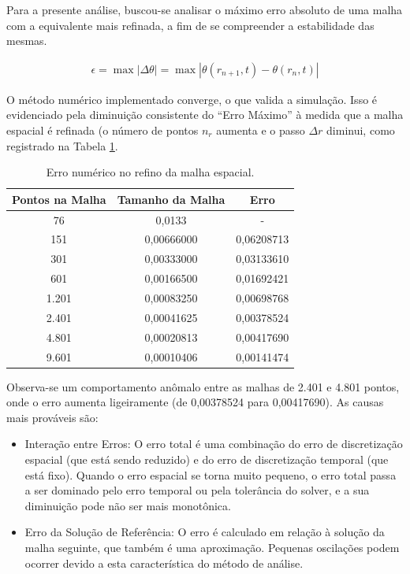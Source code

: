 Para a presente análise, buscou-se analisar o máximo erro absoluto de uma malha com a equivalente mais refinada, a fim de se compreender a estabilidade das mesmas.

\begin{gather}
    \epsilon = \max | \Delta \theta | = \max | \theta(r_{n+1},t) - \theta(r_{n},t) |
\end{gather}

O método numérico implementado converge, o que valida a simulação. Isso é evidenciado pela diminuição consistente do ``Erro Máximo'' à medida que a malha espacial é refinada (o número de pontos $n_r$ aumenta e o passo $\Delta r$ diminui, como registrado na Tabela \ref{tab:error_in_the_spatial_mesh}.

\begin{table}[H]
    \centering
    \caption{Erro numérico no refino da malha espacial.}
    \begin{tabular}{ccc}
        \textbf{Pontos na   Malha} & \textbf{Tamanho da Malha} & \textbf{Erro} \\
        \hline
        76   & 0,0133     & -          \\
        151  & 0,00666000 & 0,06208713 \\
        301  & 0,00333000 & 0,03133610 \\
        601  & 0,00166500 & 0,01692421 \\
        1.201 & 0,00083250 & 0,00698768 \\
        2.401 & 0,00041625 & 0,00378524 \\
        4.801 & 0,00020813 & 0,00417690 \\
        9.601 & 0,00010406 & 0,00141474
    \end{tabular}
    \label{tab:error_in_the_spatial_mesh}
\end{table}

Observa-se um comportamento anômalo entre as malhas de 2.401 e 4.801 pontos, onde o erro aumenta ligeiramente (de 0,00378524 para 0,00417690). As causas mais prováveis são:

\begin{itemize}
    \item Interação entre Erros: O erro total é uma combinação do erro de discretização espacial (que está sendo reduzido) e do erro de discretização temporal (que está fixo). Quando o erro espacial se torna muito pequeno, o erro total passa a ser dominado pelo erro temporal ou pela tolerância do solver, e a sua diminuição pode não ser mais monotônica.
    \item Erro da Solução de Referência: O erro é calculado em relação à solução da malha seguinte, que também é uma aproximação. Pequenas oscilações podem ocorrer devido a esta característica do método de análise.
\end{itemize}

